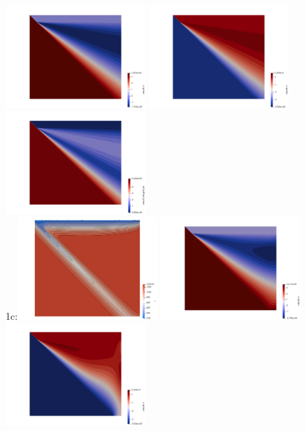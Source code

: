 \begin{landscape}
\begin{center}
\includegraphics[width=5.3cm]{python_codes/fieldstone_68/results/case1b/u_1b}
\includegraphics[width=5.3cm]{python_codes/fieldstone_68/results/case1b/v_1b}
\includegraphics[width=5.3cm]{python_codes/fieldstone_68/results/case1b/vel_1b}\\
1c:\includegraphics[width=5.3cm]{python_codes/fieldstone_68/results/case1c/T_1c}
\includegraphics[width=5.3cm]{python_codes/fieldstone_68/results/case1c/u_1c}
\includegraphics[width=5.3cm]{python_codes/fieldstone_68/results/case1c/v_1c}

\end{center}
\end{landscape}

